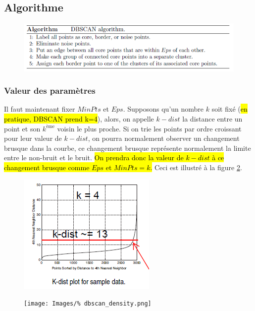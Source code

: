 \documentclass[letterpaper, 12pt]{article}
\newcommand{\alinea}{
\hspace*{0.5cm}}
\begin{document}
		\subsection{Algorithme}
			\begin{figure}[H]
				\centering
				\includegraphics[scale=1]{Images/dbscan_algo.png}
				\caption{}
				\label{fig:dbscan:algo}
			\end{figure}\noindent
			\subsubsection{Valeur des paramètres}
				\alinea Il faut maintenant fixer $MinPts$ et $Eps$.
					Supposons qu'un nombre $k$ soit fixé (\hl{en pratique, 
					DBSCAN prend k=4}), alors, on appelle $k-dist$ la 
					distance entre un point et son $k^{\text{ème}}$ voisin 
					le plus proche. Si on trie les points par ordre 
					croissant pour leur valeur de $k-dist$, on pourra
					normalement observer un changement brusque dans la 
					courbe, ce changement brusque représente 
					normalement la limite entre le non-bruit et le bruit.
					\hl{On prendra donc la valeur de $k-dist$ à ce changement
					brusque comme $Eps$ et $MinPts = k$.} Ceci est illustré
					à la figure \ref{fig:dbscan:k}.\\
					\begin{minipage}{0.475\textwidth}
						\begin{figure}[H]
							\centering
							\includegraphics[scale=0.8]{Images/dbscan_k.png}
							\caption{}
							\label{fig:dbscan:k}
						\end{figure}\noindent
					\end{minipage}\hfill
					\begin{minipage}{0.475\textwidth}
						\begin{figure}[H]
							\centering
							\texttt{[image: Images/\%
								dbscan\_density.png]}
							\caption{}
							\label{fig:dbscan:density}
						\end{figure}\noindent
					\end{minipage}\noindent~\\~\\
\end{document}
